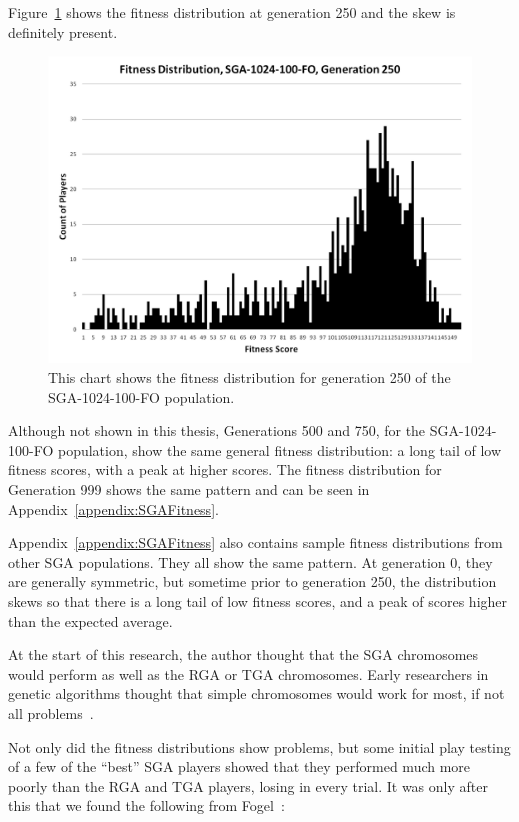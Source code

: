 Figure~\ref{figure-sga_gen250} shows the fitness distribution at generation 250
and the skew is definitely present.

\begin{figure}[htp]
\centerline{\includegraphics[width=0.75\columnwidth]{Figures/SGA_1024_100_FO_gen250.png}}
\caption[SGA Fitness Generation 289]{This chart shows the fitness
distribution for generation 250 of the SGA-1024-100-FO population.}
\label{figure-sga_gen250}
\end{figure}

Although not shown in this thesis, Generations 500 and 750, for the
SGA-1024-100-FO population, show the same general fitness distribution: a long
tail of low fitness scores, with a peak at higher scores. The fitness
distribution for Generation 999 shows the same pattern and can be seen in
Appendix~\ref{appendix:SGAFitness}.

Appendix~\ref{appendix:SGAFitness} also contains sample fitness distributions
from other SGA populations. They all show the same pattern. At generation 0,
they are generally symmetric, but sometime prior to generation 250, the
distribution skews so that there is a long tail of low fitness scores, and a
peak of scores higher than the expected average.

At the start of this research, the author thought that the SGA chromosomes would
perform as well as the RGA or TGA chromosomes. Early researchers in genetic
algorithms thought that simple chromosomes would work for most, if not all
problems~\cite{goldberg1989genetic}.

Not only did the fitness distributions show problems, but some initial play
testing of a few of the ``best'' SGA players showed that they performed much
more poorly than the RGA and TGA players, losing in every trial. It was only
after this that we found the following from Fogel~\cite{fogel1999intelligence}:

